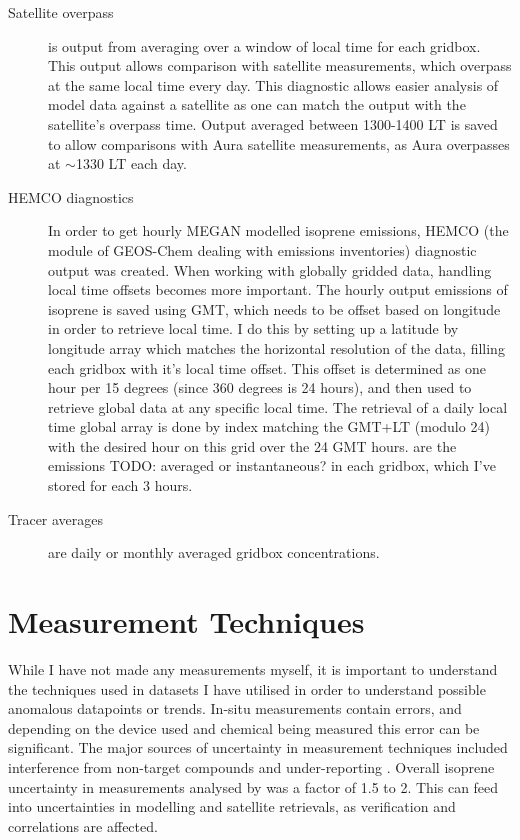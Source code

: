     
    \begin{description}
      \item[Satellite overpass]%
        is output from averaging over a window of local time for each gridbox. 
        This output allows comparison with satellite measurements, which overpass at the same local time every day.
        This diagnostic allows easier analysis of model data against a satellite as one can match the output with the satellite's overpass time.
        Output averaged between 1300-1400 LT is saved to allow comparisons with Aura satellite measurements, as Aura overpasses at $\sim$1330 LT each day.
      \item[HEMCO diagnostics]%
        In order to get hourly MEGAN modelled isoprene emissions, HEMCO (the module of GEOS-Chem dealing with emissions inventories) diagnostic output was created.
        When working with globally gridded data, handling local time offsets becomes more important.
        The hourly output emissions of isoprene is saved using GMT, which needs to be offset based on longitude in order to retrieve local time.
        I do this by setting up a latitude by longitude array which matches the horizontal resolution of the data, filling each gridbox with it's local time offset.
        This offset is determined as one hour per 15 degrees (since 360 degrees is 24 hours), and then used to retrieve global data at any specific local time.
        The retrieval of a daily local time global array is done by index matching the GMT+LT (modulo 24) with the desired hour on this grid over the 24 GMT hours.
        are the emissions TODO: averaged or instantaneous? in each gridbox, which I've stored for each 3 hours.
      \item[Tracer averages]%
        are daily or monthly averaged gridbox concentrations.
      
    \end{description}
     
      
\section{Measurement Techniques}
  \label{Model:Meas}
  While I have not made any measurements myself, it is important to understand the techniques used in datasets I have utilised in order to understand possible anomalous datapoints or trends.
  In-situ measurements contain errors, and depending on the device used and chemical being measured this error can be significant.
  The major sources of uncertainty in measurement techniques included interference from non-target compounds and under-reporting \parencite[eg.][]{Dunne2017}.
  Overall isoprene uncertainty in measurements analysed by \textcite{Dunne2017} was a factor of 1.5 to 2.
  This can feed into uncertainties in modelling and satellite retrievals, as verification and correlations are affected.
  
